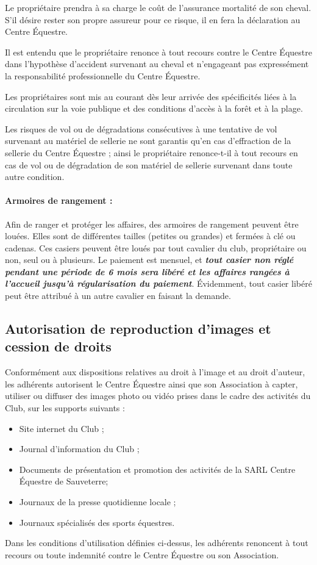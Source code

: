 \documentclass[11pt,a4paper]{article}
\begin{document}
Le propriétaire prendra à sa charge le coût de l'assurance mortalité de son cheval. S'il désire rester son propre assureur pour ce risque, il en fera la déclaration au Centre Équestre.

Il est entendu que le propriétaire renonce à tout recours contre le Centre Équestre dans l'hypothèse d'accident survenant au cheval et n'engageant pas expressément la responsabilité professionnelle du Centre Équestre.

Les propriétaires sont mis au courant dès leur arrivée des spécificités liées à la circulation sur la voie publique et des conditions d'accès à la forêt et à la plage.

Les risques de vol ou de dégradations consécutives à une tentative de vol survenant au matériel de sellerie ne sont garantis qu'en cas d'effraction de la sellerie du Centre Équestre ; ainsi le propriétaire renonce-t-il à tout recours en cas de vol ou de dégradation de son matériel de sellerie survenant dans toute autre condition.

\paragraph{Armoires de rangement :\\}
Afin de ranger et protéger les affaires, des armoires de rangement peuvent être louées. Elles sont de différentes tailles (petites ou grandes) et fermées à clé ou cadenas. Ces \og casiers \fg{} peuvent être loués par tout cavalier du club, propriétaire ou non, seul ou à plusieurs. Le paiement est mensuel, et \textit{\textbf{tout casier non réglé pendant une période de 6 mois sera libéré et les affaires rangées à l'accueil jusqu'à régularisation du paiement}}. Évidemment, tout casier libéré peut être attribué à un autre cavalier en faisant la demande.

\subsection{Autorisation de reproduction d'images et cession de droits}
Conformément aux dispositions relatives au droit à l'image et au droit d'auteur, les adhérents autorisent le Centre Équestre ainsi que son Association à capter, utiliser ou diffuser des images photo ou vidéo prises dans le cadre des activités du Club, sur les supports suivants :
\begin{itemize}
\item
Site internet du Club ;
\item
Journal d'information du Club ;
\item
Documents de présentation et promotion des activités de la SARL Centre Équestre de Sauveterre;
\item
Journaux de la presse quotidienne locale ;
\item
Journaux spécialisés des sports équestres.
\end{itemize}
Dans les conditions d'utilisation définies ci-dessus, les adhérents renoncent à tout recours ou toute indemnité contre le Centre Équestre ou son Association.
\end{document}
